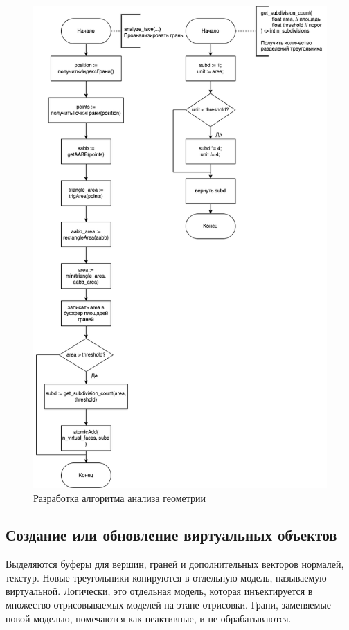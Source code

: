 \begin{figure}[H]
	\centering
	\includegraphics[height=0.95\textheight]{img/diagrams-vgeom_analyzer.drawio.png}
	\caption{Разработка алгоритма анализа геометрии}
	\label{fig:geom_analyzer_kernel}
\end{figure}


\subsection{Создание или обновление виртуальных объектов}

Выделяются буферы для вершин, граней и дополнительных векторов нормалей, текстур.
Новые треугольники копируются в отдельную модель, называемую виртуальной. Логически, это отдельная модель, которая инъектируется в множество отрисовываемых моделей на этапе отрисовки.
Грани, заменяемые новой моделью, помечаются как неактивные, и не обрабатываются.

